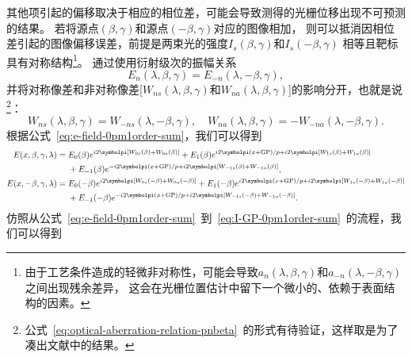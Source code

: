 其他项引起的偏移取决于相应的相位差，可能会导致测得的光栅位移出现不可预测的结果。
若将源点$(\beta,\gamma)$和源点$(-\beta,\gamma)$对应的图像相加，
则可以抵消因相位差引起的图像偏移误差，前提是两束光的强度$I_s(\beta,\gamma)$和$I_s(-\beta,\gamma)$
相等且靶标具有对称结构\footnote[1]{由于工艺条件造成的轻微非对称性，可能会导致$a_n(\lambda,\beta,\gamma)$和$a_{-n}(\lambda,-\beta,\gamma)$之间出现残余差异，
这会在光栅位置估计中留下一个微小的、依赖于表面结构的因素。}。
通过使用衍射级次的振幅关系
\begin{equation}\label{eq:e-amplitude-relation-pnbeta}
E_n(\lambda,\beta,\gamma)=E_{-n}(\lambda,-\beta,\gamma),
\end{equation}
并将对称像差和非对称像差[$W_{ns}(\lambda,\beta,\gamma)$和$W_{na}(\lambda,\beta,\gamma)$]的影响分开，也就是说\footnote[2]{
公式~\eqref{eq:optical-aberration-relation-pnbeta}~的形式有待验证，这样取是为了凑出文献\cite{adel2008diffraction}中的结果。}：
\begin{equation}\label{eq:optical-aberration-relation-pnbeta}
W_{ns}(\lambda,\beta,\gamma) = W_{-ns}(\lambda,-\beta,\gamma), \quad
W_{na}(\lambda,\beta,\gamma) = - W_{-na}(\lambda,-\beta,\gamma).
\end{equation}
根据公式~\eqref{eq:e-field-0pm1order-sum}，我们可以得到
\begin{equation*}
\begin{aligned}
E(x,\beta,\gamma,\lambda) &=
E_0(\beta)e^{i2\symbolpi[W_{0s}(\beta)+W_{0a}(\beta)]} + E_1(\beta)e^{i2\symbolpi(x+\text{GP})/p+i2\symbolpi[W_{1s}(\beta)+W_{1a}(\beta)]} \\
&\quad~ +E_{-1}(\beta)e^{-i2\symbolpi(x+\text{GP})/p+i2\symbolpi[W_{-1s}(\beta)+W_{-1a}(\beta)]}, \\
E(x,-\beta,\gamma,\lambda) &=
E_0(-\beta)e^{i2\symbolpi[W_{0s}(-\beta)+W_{0a}(-\beta)]} + E_1(-\beta)e^{i2\symbolpi(x+\text{GP})/p+i2\symbolpi[W_{1s}(-\beta)+W_{1a}(-\beta)]} \\
&\quad~ +E_{-1}(-\beta)e^{-i2\symbolpi(x+\text{GP})/p+i2\symbolpi[W_{-1s}(-\beta)+W_{-1a}(-\beta)]}.
\end{aligned}
\end{equation*}
仿照从公式~\eqref{eq:e-field-0pm1order-sum}~到~\eqref{eq:I-GP-0pm1order-sum}~的流程，我们可以得到

